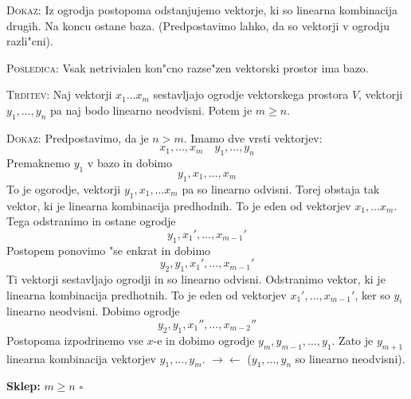 \textsc{Dokaz:} Iz ogrodja postopoma odstanjujemo vektorje, ki so linearna kombinacija drugih. Na koncu ostane baza. (Predpostavimo lahko, da so vektorji v ogrodju razli"cni).

\textsc{Posledica:} Vsak netrivialen kon"cno razse"zen vektorski prostor ima bazo.

\textsc{Trditev:} Naj vektorji $x_1 \ldots x_m$ sestavljajo ogrodje vektorskega prostora $V$, vektorji $y_1, \ldots, y_n$ pa naj bodo linearno neodvisni. Potem je $m \geq n$.

\textsc{Dokaz:} Predpostavimo, da je $n > m$. Imamo dve vrsti vektorjev:
\begin{equation*}
x_1, \ldots , x_m \quad y_1, \ldots, y_n
\end{equation*}
Premaknemo $y_1$ v bazo in dobimo
\begin{equation*}
y_1, x_1, \ldots, x_m
\end{equation*}
To je ogorodje, vektorji $y_1, x_1, \ldots x_m$ pa so linearno odvisni. Torej obstaja tak vektor, ki je linearna kombinacija predhodnih. To je eden od vektorjev $x_1, \ldots x_m$. Tega odstranimo in ostane ogrodje
\begin{equation*}
y_1, x_1', \ldots, x_{m-1}'
\end{equation*}
Postopem ponovimo "se enkrat in dobimo
\begin{equation*}
y_2, y_1, x_1', \ldots, x_{m-1}'
\end{equation*}
Ti vektorji sestavljajo ogrodji in so linearno odvisni. Odstranimo vektor, ki je linearna kombinacija predhotnih. To je eden od vektorjev $x_1', \ldots, x_{m-1}'$, ker so $y_i$ linearno neodvisni. Dobimo ogrodje
\begin{equation*}
y_2, y_1, x_1'', \ldots, x_{m-2}''
\end{equation*}
Postopoma izpodrinemo vse $x$-e in dobimo ogrodje $y_m, y_{m-1}, \ldots, y_1$. Zato je $y_{m+1}$ linearna kombinacija vektorjev $y_1, \ldots, y_m$. $\rightarrow \leftarrow$ ($y_1, \ldots, y_n$ so linearno neodvisni).

\textbf{Sklep:} $m \geq n$ \hfill $\square$